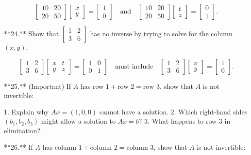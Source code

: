 \[\begin{bmatrix}10&20\\ 20&50\end{bmatrix}\begin{bmatrix}x\\ y\end{bmatrix}=\begin{bmatrix}1\\ 0\end{bmatrix}\quad\text{and}\quad\begin{bmatrix}10&20\\ 20&50\end{bmatrix}\begin{bmatrix}t\\ z\end{bmatrix}=\begin{bmatrix}0\\ 1\end{bmatrix}.\]

**24.** Show that \(\begin{bmatrix}1&2\\ 3&6\end{bmatrix}\) has no inverse by trying to solve for the column \((x,y)\):

\[\begin{bmatrix}1&2\\ 3&6\end{bmatrix}\begin{bmatrix}x&t\\ y&z\end{bmatrix}=\begin{bmatrix}1&0\\ 0&1\end{bmatrix}\quad\text{must include}\quad\begin{bmatrix}1&2\\ 3&6\end{bmatrix}\begin{bmatrix}x\\ y\end{bmatrix}=\begin{bmatrix}1\\ 0\end{bmatrix}.\]

**25.** (Important) If \(A\) has row \(1+\text{row }2=\text{row }3\), show that \(A\) is not invertible:

1. Explain why \(Ax=(1,0,0)\) cannot have a solution.
2. Which right-hand sides \((b_{1},b_{2},b_{3})\) might allow a solution to \(Ax=b\)?
3. What happens to row 3 in elimination?

**26.** If \(A\) has column \(1+\text{column }2=\text{column }3\), show that \(A\) is not invertible: